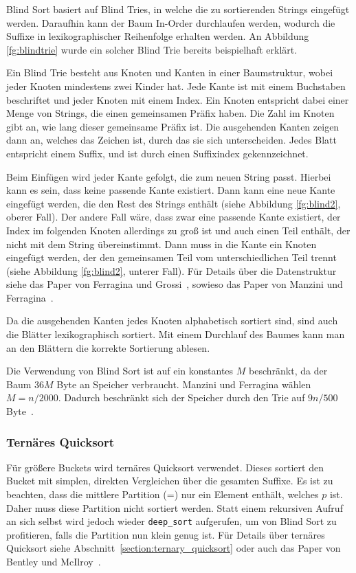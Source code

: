 Blind Sort basiert auf Blind Tries, in welche die zu sortierenden Strings eingefügt werden.
Daraufhin kann der Baum In-Order durchlaufen werden, wodurch die Suffixe in lexikographischer Reihenfolge erhalten werden.
An Abbildung \ref{fg:blindtrie} wurde ein solcher Blind Trie bereits beispielhaft erklärt.

Ein Blind Trie besteht aus Knoten und Kanten in einer Baumstruktur, wobei jeder Knoten mindestens zwei Kinder hat.
Jede Kante ist mit einem Buchstaben beschriftet und jeder Knoten mit einem Index.
Ein Knoten entspricht dabei einer Menge von Strings, die einen gemeinsamen Präfix haben.
Die Zahl im Knoten gibt an, wie lang dieser gemeinsame Präfix ist.
Die ausgehenden Kanten zeigen dann an, welches das Zeichen ist, durch das sie sich unterscheiden.
Jedes Blatt entspricht einem Suffix, und ist durch einen Suffixindex gekennzeichnet.

Beim Einfügen wird jeder Kante gefolgt, die zum neuen String passt.
Hierbei kann es sein, dass keine passende Kante existiert.
Dann kann eine neue Kante eingefügt werden, die den Rest des Strings enthält (siehe Abbildung \ref{fg:blind2}, oberer Fall).
Der andere Fall wäre, dass zwar eine passende Kante existiert, der Index im folgenden Knoten allerdings zu groß ist und auch einen Teil enthält, der nicht mit dem String übereinstimmt.
Dann muss in die Kante ein Knoten eingefügt werden, der den gemeinsamen Teil vom unterschiedlichen Teil trennt (siehe Abbildung \ref{fg:blind2}, unterer Fall).
Für Details über die Datenstruktur siehe das Paper von Ferragina und Grossi~\cite{ds:blind}, sowieso das Paper von Manzini und Ferragina~\cite{saca:4}.

Da die ausgehenden Kanten jedes Knoten alphabetisch sortiert sind, sind auch die Blätter lexikographisch sortiert.
Mit einem Durchlauf des Baumes kann man an den Blättern die korrekte Sortierung ablesen.

Die Verwendung von Blind Sort ist auf ein konstantes $M$ beschränkt, da der Baum $36 M$ Byte an Speicher verbraucht.
Manzini und Ferragina wählen $M = n / 2000$.
Dadurch beschränkt sich der Speicher durch den Trie auf $9n/500$ Byte~\cite{saca:4}.

\subsubsection{Ternäres Quicksort}
Für größere Buckets wird ternäres Quicksort verwendet.
Dieses sortiert den Bucket mit simplen, direkten Vergleichen über die gesamten Suffixe.
Es ist zu beachten, dass die mittlere Partition (\glqq =\grqq) nur ein Element enthält, welches $p$ ist.
Daher muss diese Partition nicht sortiert werden.
Statt einem rekursiven Aufruf an sich selbst wird jedoch wieder \texttt{deep\_sort} aufgerufen, um von Blind Sort zu profitieren, falls die Partition nun klein genug ist.
Für Details über ternäres Quicksort siehe Abschnitt~\ref{section:ternary_quicksort} oder auch das Paper von Bentley und McIlroy~\cite{ternary_quicksort}.

